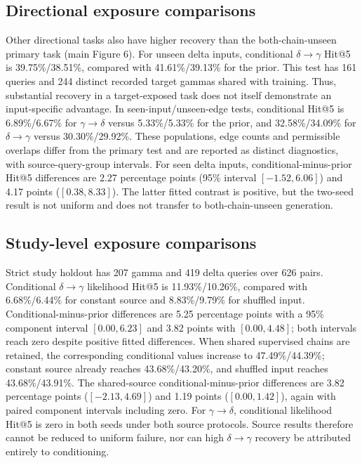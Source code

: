\documentclass[a4paper,11pt]{article}
\newcommand{\gtd}{\ensuremath{\gamma\!\rightarrow\!\delta}}
\newcommand{\dtg}{\ensuremath{\delta\!\rightarrow\!\gamma}}
\begin{document}
\FloatBarrier


\subsection{Directional exposure comparisons}
Other directional tasks also have higher recovery than the both-chain-unseen
primary task (main Figure 6). For unseen delta inputs, conditional \dtg{} Hit@5 is 39.75\%/38.51\%,
compared with 41.61\%/39.13\% for the prior. This test has 161 queries and
244 distinct recorded target gammas shared with training. Thus, substantial
recovery in a target-exposed task does not itself demonstrate an input-specific
advantage. In seen-input/unseen-edge tests, conditional Hit@5 is
6.89\%/6.67\% for \gtd{} versus 5.33\%/5.33\% for the prior, and
32.58\%/34.09\% for \dtg{} versus 30.30\%/29.92\%. These populations,
edge counts and permissible overlaps differ from the primary test and are
reported as distinct diagnostics, with source-query-group intervals.
For seen delta inputs, conditional-minus-prior Hit@5 differences are 2.27
percentage points (95\% interval $[-1.52,6.06]$) and 4.17 points
($[0.38,8.33]$). The latter fitted contrast is positive, but the two-seed
result is not uniform and does not transfer to both-chain-unseen generation.

\subsection{Study-level exposure comparisons}
Strict study holdout has 207 gamma and 419 delta queries over 626 pairs.
Conditional \dtg{} likelihood Hit@5 is 11.93\%/10.26\%, compared with
6.68\%/6.44\% for constant source and 8.83\%/9.79\% for shuffled input.
Conditional-minus-prior differences are 5.25 percentage points with a 95\%
component interval $[0.00,6.23]$ and 3.82 points with $[0.00,4.48]$;
both intervals reach zero despite positive fitted differences.
When shared supervised chains are retained, the corresponding conditional
values increase to 47.49\%/44.39\%; constant source already reaches
43.68\%/43.20\%, and shuffled input reaches 43.68\%/43.91\%.
The shared-source conditional-minus-prior differences are 3.82 percentage
points ($[-2.13,4.69]$) and 1.19 points ($[0.00,1.42]$), again with paired
component intervals including zero.
For \gtd{}, conditional likelihood Hit@5 is zero in both seeds under both
source protocols. Source results therefore cannot be reduced to uniform
failure, nor can high \dtg{} recovery be attributed entirely to conditioning.
\end{document}
